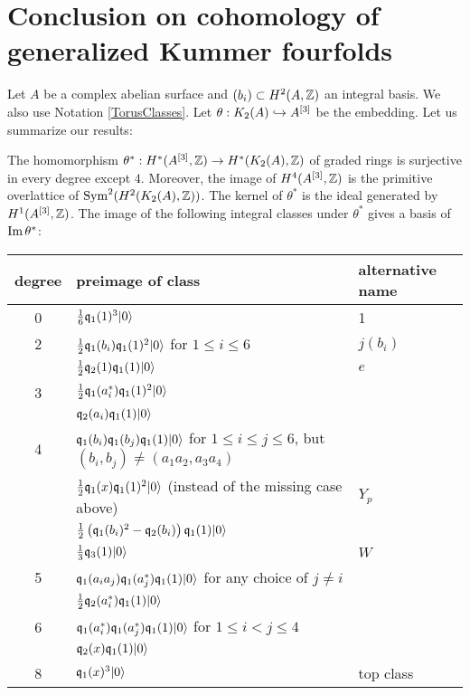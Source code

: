 \section{Conclusion on cohomology of generalized Kummer fourfolds}
Let $A$ be a complex abelian surface and $(b_i)\subset H^2(A,\Z)$ an integral basis. We also use Notation \ref{TorusClasses}. Let $\theta: \kum{A}{2}\hookrightarrow A\hilb{3}$ be the embedding. 
Let us summarize our results:
\begin{theorem}\label{thetaTheorem}
The homomorphism $\theta^*:H^*(A\hilb{3},\Z)\rightarrow H^*(\kum{A}{2},\Z)$ of graded rings is surjective in every degree except $4$. Moreover, the image of $H^4(A\hilb{3},\Z)$ is the primitive overlattice of $\Sym^2(H^2(\kum{A}{2},\Z))$. 
The kernel of $\theta^*$ is the ideal generated by $H^1(A\hilb{3},\Z)$.
The image of the following integral classes under $\theta^*$ gives a basis of $\im\theta^*$:
\begin{center}
\begin{tabular}{c|l|l}
degree & preimage of class & alternative name  \\
\hline
0 & $\frac{1}{6} \q_1(1)^3\vac$ & 1 \\
\hline
2 &  $\frac{1}{2}\q_1(b_i) \q_1(1)^2\vac$ for $1\leq i\leq 6$ & $j(b_i)$ \\
 & $\frac{1}{2} \q_2(1)\q_1(1)\vac $  & $e$\\
\hline
3 & $\frac{1}{2}\q_1(a^*_i)\q_1(1)^2\vac$ & \\
  & $\q_2(a_i)\q_1(1)\vac$ & \\
\hline
4 & $\q_1(b_i)\q_1(b_j)\q_1(1)\vac$ for $1\leq i\leq j\leq 6$, but $(b_i,b_j)\neq(a_1a_2,a_3a_4)$ &\\
  & $\frac{1}{2}\q_1(x)\q_1(1)^2\vac$ (instead of the missing case above)  & $Y_p$\\
  & $\frac{1}{2}\left(\q_1(b_i)^2-\q_2(b_i)\right)\q_1(1)\vac$ & \\
  & $\frac{1}{3} \q_3(1)\vac$ & $W$ \\
\hline
5 & $\q_1(a_ia_j)\q_1(a_j^*)\q_1(1) \vac$ for any choice of $j\neq i$ &\\
  & $\frac{1}{2} \q_2(a^*_i)\q_1(1)\vac $ &\\
\hline
6 & $\q_1(a_i^*)\q_1(a_j^*)\q_1(1)\vac$ for $1\leq i< j\leq 4$ & \\
  & $\q_2(x)\q_1(1)\vac$ & \\
\hline
8 & $\q_1(x)^3\vac$ & top class
\end{tabular}
\end{center}
\end{theorem}
